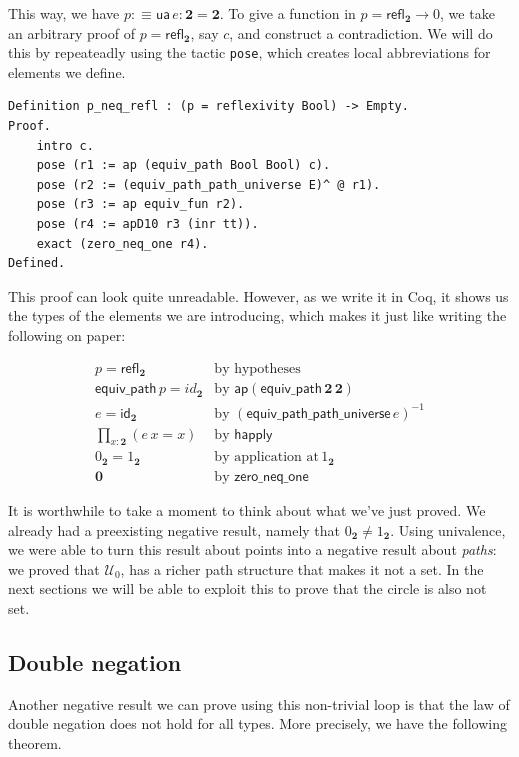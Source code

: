 \documentclass[12 pt]{amsart}
\theoremstyle{definition}
\theoremstyle{remark}
\newcommand{\Type}{\mathcal{U}}
\newcommand{\ap}{\mathsf{ap}}
\newcommand{\refl}{\mathsf{refl}}
\newcommand{\bool}{{\mathbf{2}}}
\newcommand{\boolone}{1_\bool}
\newcommand{\boolzero}{0_\bool}
\newcommand{\zero}{{\mathbf{0}}}
\newcommand{\ua}{{\mathsf{ua}}}
\newcommand{\happly}{{\mathsf{happly}}}
\newcommand{\idtoeqv}{{\mathsf{equiv\_path}}}
\newcommand{\id}{{\mathsf{id}}}
\newcommand{\zeroneqone}{{\mathsf{zero\_neq\_one}}}
\newcommand{\equivpathpathuniverse}{\mathsf{equiv\_path\_path\_universe}}
\begin{document}
This way, we have $p :\equiv \ua\,e: \bool = \bool$. To give a function in $p = \refl_\bool \to 0$, we take an arbitrary proof of $p = \refl_\bool$, say $c$, and construct a contradiction. We will do this by repeateadly using the tactic \texttt{pose}, which creates local abbreviations for elements we define.

\begin{lstlisting}
Definition p_neq_refl : (p = reflexivity Bool) -> Empty.
Proof.
    intro c.
    pose (r1 := ap (equiv_path Bool Bool) c).
    pose (r2 := (equiv_path_path_universe E)^ @ r1).
    pose (r3 := ap equiv_fun r2).
    pose (r4 := apD10 r3 (inr tt)).
    exact (zero_neq_one r4).
Defined.
\end{lstlisting}

This proof can look quite unreadable. However, as we write it in Coq, it shows us the types of the elements we are introducing, which makes it just like writing the following on paper:

\begin{eqnarray}
    p = \refl_\bool \nonumber & \text{by hypotheses} \\
    \idtoeqv\, p = id_\bool \nonumber  & \text{by}\,\, \ap (\idtoeqv \,\bool \,\bool)  \\ 
    e = \id_\bool \nonumber  &  \text{by}\,\,(\equivpathpathuniverse \,e)^{-1} \\
     \prod_{x : \bool} (e\,x = x) & \text{by}\,\, \happly \nonumber \\
     \boolzero = \boolone \nonumber & \text{by application at} \, \boolone\\
     \zero & \text{by}\,\, \zeroneqone\nonumber
\end{eqnarray}


It is worthwhile to take a moment to think about what we've just proved. We already had a preexisting negative result, namely that $\boolzero \neq \boolone$. Using univalence, we were able to turn this result about points into a negative result about \textit{paths}: we proved that $\Type_0$, has a richer path structure that makes it not a set. In the next sections we will be able to exploit this to prove that the circle is also not set.

\subsection{Double negation}
\label{subsec:dubneg}

Another negative result we can prove using this non-trivial loop is that the law of double negation does not hold for all types. More precisely, we have the following theorem.
\end{document}
